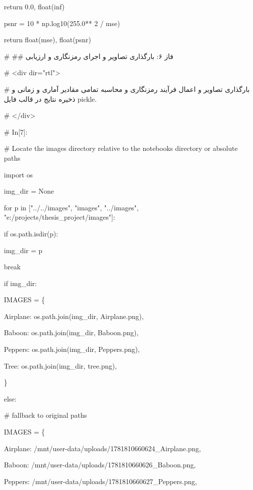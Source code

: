 return 0.0, float(\textquotesingle inf\textquotesingle)

psnr = 10 * np.log10(255.0** 2 / mse)

return float(mse), float(psnr)

\# \#\# فاز ۶: بارگذاری تصاویر و اجرای رمزنگاری و ارزیابی

\# \textless div dir="rtl"\textgreater{}

\# بارگذاری تصاویر و اعمال فرآیند رمزنگاری و محاسبه تمامی مقادیر آماری و زمانی و ذخیره نتایج در قالب فایل pickle.

\# \textless/div\textgreater{}

\# In{[}7{]}:

\# Locate the images directory relative to the notebook\textquotesingle s directory or absolute paths

import os

img\_dir = None

for p in {[}"../../images", "images", "../images", "e:/projects/thesis\_project/images"{]}:

if os.path.isdir(p):

img\_dir = p

break

if img\_dir:

IMAGES = \{

\textquotesingle Airplane\textquotesingle: os.path.join(img\_dir, \textquotesingle Airplane.png\textquotesingle),

\textquotesingle Baboon\textquotesingle: os.path.join(img\_dir, \textquotesingle Baboon.png\textquotesingle),

\textquotesingle Peppers\textquotesingle: os.path.join(img\_dir, \textquotesingle Peppers.png\textquotesingle),

\textquotesingle Tree\textquotesingle: os.path.join(img\_dir, \textquotesingle tree.png\textquotesingle),

\}

else:

\# fallback to original paths

IMAGES = \{

\textquotesingle Airplane\textquotesingle: \textquotesingle/mnt/user-data/uploads/1781810660624\_Airplane.png\textquotesingle,

\textquotesingle Baboon\textquotesingle: \textquotesingle/mnt/user-data/uploads/1781810660626\_Baboon.png\textquotesingle,

\textquotesingle Peppers\textquotesingle: \textquotesingle/mnt/user-data/uploads/1781810660627\_Peppers.png\textquotesingle,


